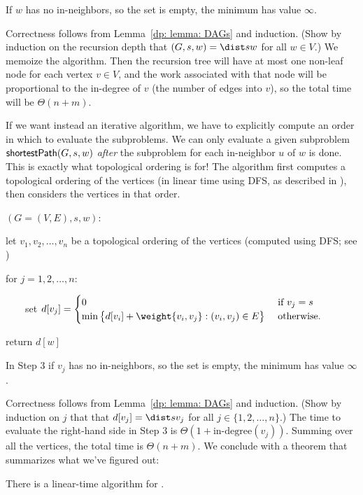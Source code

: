 If $w$ has no in-neighbors, so the set is empty, the minimum has value $\infty$.

Correctness follows from Lemma~\ref{dp: lemma: DAGs} and induction.
(Show by induction on the recursion depth
that \shortestPath$(G, s, w) = \dist s w$ for all $w\in V$.)
We memoize the algorithm.  Then the recursion tree will have
at most one non-leaf node for each vertex $v\in V$,
and the work associated with that node will be proportional to the in-degree of $v$
(the number of edges into $v$),
so the total time will be $\Theta(n+m)$.

If we want instead an iterative algorithm, we have to explicitly compute an order
in which to evaluate the subproblems.  We can only evaluate a given subproblem
$\textsf{shortestPath}(G, s, w)$
\emph{after}
the subproblem for each in-neighbor $u$ of $w$ is done.
This is exactly what topological ordering is for!
The algorithm first computes a topological ordering of the vertices
(in linear time using DFS, as described in ),
then considers the vertices in that order.

\begin{myframed}
  \begin{steps}
  \item[]\shortestPath$(G=(V,E), s, w)$:

    \step let $v_1, v_2, \ldots, v_n$ be a topological ordering of the vertices (computed using DFS; see )
    
    \step for $j=1,2,\ldots, n$:

    \step~~~~set \(d[v_j] = 
    \begin{cases}
      0 & \text{ if } v_j = s \\
      \min \big\{ d[v_i] + \weight {v_i,v_j}: (v_i, v_j)\in E\big\}  & \text{ otherwise.}
    \end{cases}
    \)

    \step return $d[w]$
    
  \end{steps}
\end{myframed}

In Step 3 if $v_j$ has no in-neighbors, so the set is empty, the minimum has value $\infty$.

Correctness follows from Lemma~\ref{dp: lemma: DAGs} and induction. 
(Show by induction on $j$ that
that $d[v_j] = \dist s {v_j}$ for all $j\in\{1,2,\ldots,n\}$.)
The time to evaluate the right-hand side in Step 3 is $\Theta(1+\text{in-degree}(v_j))$.
Summing over all the vertices,
the total time is $\Theta(n+m)$.
We conclude with a theorem that summarizes what we've figured out:
\begin{theorem}
  There is a linear-time algorithm for .
\end{theorem}

